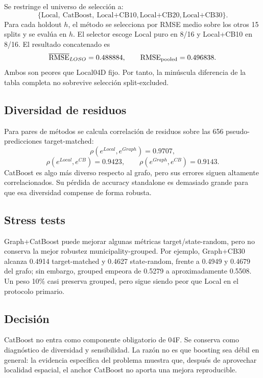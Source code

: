 Se restringe el universo de selección a:
\[
\{\text{Local},\ \text{CatBoost},\
\text{Local+CB10},\text{Local+CB20},\text{Local+CB30}\}.
\]
Para cada holdout $h$, el método se selecciona por RMSE medio sobre los otros 15 splits y se
evalúa en $h$. El selector escoge Local puro en 8/16 y Local+CB10 en 8/16. El resultado
concatenado es
\[
\overline{\operatorname{RMSE}}_{LOSO}=0.488884,
\qquad
\operatorname{RMSE}_{\mathrm{pooled}}=0.496838.
\]
Ambos son peores que Local04D fijo. Por tanto, la minúscula diferencia de la tabla completa no
sobrevive selección split-excluded.

\subsection{Diversidad de residuos}

Para pares de métodos se calcula correlación de residuos sobre las 656 pseudo-predicciones
target-matched:
\[
\rho(e^{Local},e^{Graph})=0.9707,
\]
\[
\rho(e^{Local},e^{CB})=0.9423,
\qquad
\rho(e^{Graph},e^{CB})=0.9143.
\]
CatBoost es algo más diverso respecto al grafo, pero sus errores siguen altamente
correlacionados. Su pérdida de accuracy standalone es demasiado grande para que esa diversidad
compense de forma robusta.

\subsection{Stress tests}

Graph+CatBoost puede mejorar algunas métricas target/state-random, pero no conserva la mejor
robustez municipality-grouped. Por ejemplo, Graph+CB30 alcanza 0.4914 target-matched y
0.4627 state-random, frente a 0.4949 y 0.4679 del grafo; sin embargo, grouped empeora de
0.5279 a aproximadamente 0.5508. Un peso 10\% casi preserva grouped, pero sigue siendo peor
que Local en el protocolo primario.

\subsection{Decisión}

\begin{decision}
CatBoost no entra como componente obligatorio de 04F. Se conserva como diagnóstico de
diversidad y sensibilidad. La razón no es que boosting sea débil en general: la evidencia
específica del problema muestra que, después de aprovechar localidad espacial, el anchor
CatBoost no aporta una mejora reproducible.
\end{decision}
